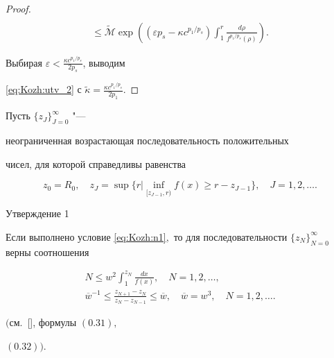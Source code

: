 \begin{proof}
\begin{multline*}
\\

\leq\widetilde{\mathcal{M}}\exp\left((\varepsilon {p_s}-\kappa

c^{p_1/p_s})\int _{1}^r\frac{d\rho}{f^{p_1/p_s}(\rho)}\right).

\end{multline*}

Выбирая $\varepsilon<\frac{\kappa c^{p_1/p_s}}{2p_s}$, выводим

\eqref{eq:Kozh:utv_2} с $\widetilde{\kappa}=\frac{\kappa

c^{p_1/p_s}}{2p_1}.$

\end{proof}



\smallskip



 Пусть $\{z_J\}^{\infty}_{J=0}$ "---

неограниченная возрастающая последовательность положительных

чисел, для которой справедливы равенства

$$

z_0=R_0, \quad z_J=\sup\bigl\{r|\inf_{[z_{J-1},r)}f(x)\geq

r-z_{J-1}\bigr\}, \quad J=1, 2, \ldots.

$$



\smallskip



\begin{newthm}{Утверждение 1}

Если выполнено условие \eqref{eq:Kozh:n1}$,$ то для последовательности $\{z_N\}_{N=0}^{\infty}$ верны соотношения

\begin{gather}

N\leq w^2\int _{1}^{z_N}\frac{dx}{f(x)}, \quad N=1, 2, \ldots,\label{eq:Kozh:n2} \\

\overline{w}^{-1}\leq

\frac{z_{N+1}-z_N}{z_N-z_{N-1}}\leq\overline{w}, \quad \overline{w}=w^3, \quad N=1, 2, \ldots.\label{eq:Kozh:n3}

\end{gather}

$($см.~{\rm [],} формулы $(0.31),$

$(0.32))$.

\end{newthm}




